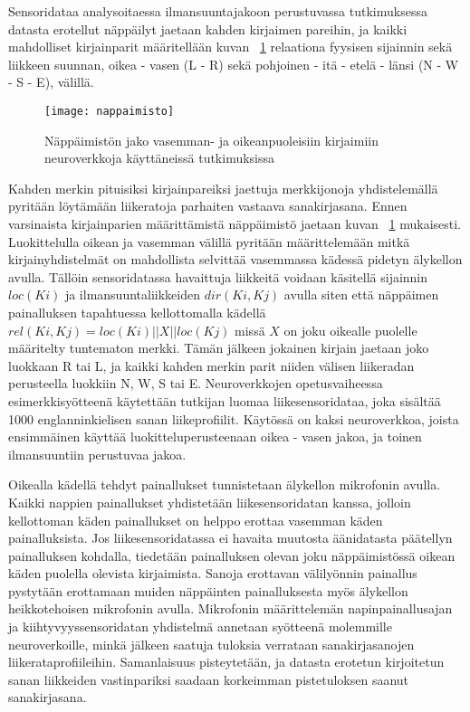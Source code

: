 \documentclass[finnish]{tktltiki2}
\theoremstyle{definition}
\theoremstyle{remark}
\begin{document}
Sensoridataa analysoitaessa ilmansuuntajakoon perustuvassa tutkimuksessa~\cite{maiti} datasta erotellut näppäilyt jaetaan kahden kirjaimen pareihin, ja kaikki mahdolliset kirjainparit määritellään kuvan ~\ref{fig:nappaimisto} relaationa fyysisen sijainnin sekä liikkeen suunnan, oikea - vasen (L - R) sekä pohjoinen - itä - etelä - länsi (N - W -
S - E), välillä.

\begin{figure} [H]
\centering
\texttt{[image: nappaimisto]}
\caption{Näppäimistön jako vasemman- ja oikeanpuoleisiin kirjaimiin neuroverkkoja käyttäneissä tutkimuksissa~\cite{maiti}}
\label{fig:nappaimisto}
\end{figure}


Kahden merkin pituisiksi kirjainpareiksi jaettuja merkkijonoja yhdistelemällä pyritään löytämään liikeratoja parhaiten vastaava sanakirjasana. Ennen varsinaista kirjainparien määrittämistä näppäimistö jaetaan kuvan ~\ref{fig:nappaimisto} mukaisesti. Luokittelulla oikean ja vasemman välillä pyritään määrittelemään mitkä kirjainyhdistelmät on mahdollista selvittää vasemmassa kädessä pidetyn älykellon avulla. Tällöin sensoridatassa havaittuja liikkeitä voidaan käsitellä sijainnin $loc(Ki)$ ja ilmansuuntaliikkeiden $dir(Ki, Kj)$ avulla siten että näppäimen painalluksen tapahtuessa kellottomalla kädellä $rel(Ki, Kj) = loc(Ki) || X || loc(Kj)$ missä $X$ on joku oikealle puolelle määritelty tuntematon merkki. Tämän jälkeen jokainen kirjain jaetaan joko luokkaan R tai L, ja kaikki kahden merkin parit niiden välisen liikeradan perusteella luokkiin N, W, S tai E.
Neuroverkkojen opetusvaiheessa esimerkkisyötteenä käytettään tutkijan luomaa liikesensoridataa, joka sisältää 1000 englanninkielisen sanan liikeprofiilit. Käytössä on kaksi neuroverkkoa, joista ensimmäinen käyttää luokitteluperusteenaan oikea - vasen jakoa, ja toinen ilmansuuntiin perustuvaa jakoa. 

Oikealla kädellä tehdyt painallukset tunnistetaan älykellon mikrofonin avulla. Kaikki nappien painallukset yhdistetään liikesensoridatan kanssa, jolloin kellottoman käden painallukset on helppo erottaa vasemman käden painalluksista. Jos liikesensoridatassa ei havaita muutosta äänidatasta päätellyn painalluksen kohdalla, tiedetään painalluksen olevan joku näppäimistössä oikean käden puolella olevista kirjaimista. Sanoja erottavan välilyönnin painallus pystytään erottamaan muiden näppäinten painalluksesta myös älykellon heikkotehoisen mikrofonin avulla. Mikrofonin määrittelemän napinpainallusajan ja kiihtyvyyssensoridatan yhdistelmä annetaan syötteenä molemmille neuroverkoille, minkä jälkeen saatuja tuloksia verrataan sanakirjasanojen liikerataprofiileihin. Samanlaisuus pisteytetään, ja datasta erotetun kirjoitetun sanan liikkeiden vastinpariksi saadaan korkeimman pistetuloksen saanut sanakirjasana. 
\end{document}

